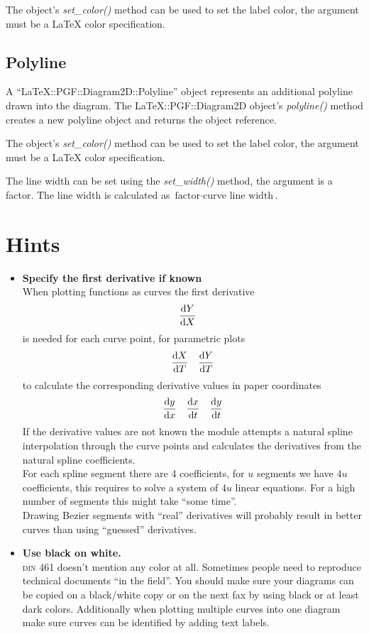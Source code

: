\documentclass[origlongtable]{scrartcl}
\begin{document}
The object's \textit{set\_color()\/} method can be used to set the label
color, the argument must be a \LaTeX{} color specification.
\clearpage
\subsection{Polyline}
A ``LaTeX::PGF::Diagram2D::Polyline'' object represents an additional
polyline drawn into the diagram.
The LaTeX::PGF::Diagram2D object's \textit{polyline()\/} method creates a new
polyline object and returns the object reference.

The object's \textit{set\_color()\/} method can be used to set the label
color, the argument must be a \LaTeX{} color specification.

The line width can be set using the \textit{set\_width()\/} method, the
argument is a factor. The line width is calculated as
\(\text{factor}\cdot{}\text{curve line width}\).
\clearpage
\section{Hints}
\begin{itemize}
\item	\textbf{Specify the first derivative if known}\\
When plotting functions as curves the first derivative
\begin{align*}\frac{\mathrm{d} Y}{\mathrm{d} X}&\end{align*} is needed for each curve
point, for parametric plots
\begin{align*}\frac{\mathrm{d} X}{\mathrm{d} T}&&\frac{\mathrm{d} Y}{\mathrm{d} T}\end{align*}
to calculate the corresponding derivative values in paper coordinates
\begin{align*}\frac{\mathrm{d} y}{\mathrm{d} x}&&\frac{\mathrm{d} x}{\mathrm{d} t}&&\frac{\mathrm{d} y}{\mathrm{d} t}\end{align*}
If the derivative values are not known the module attempts a natural spline
interpolation through the curve points and calculates the derivatives from
the natural spline coefficients.\\
For each spline segment there are 4 coefficients, for \(u\) segments we
have \(4u\) coefficients, this requires to solve a system of \(4u\)
linear equations. For a high number of segments this might take
``some time''.\\
Drawing Bezier segments with ``real'' derivatives will probably result
in better curves than using ``guessed'' derivatives.
\item	\textbf{Use black on white.}\\
\textsc{din} 461 doesn't mention any color at all. Sometimes people need to
reproduce technical documents ``in the field''. You should make sure your
diagrams can be copied  on a black/white copy or on the next fax by
using black or at least dark colors. Additionally when plotting
multiple curves into one diagram make sure curves can be identified
by adding text labels.
\end{itemize}
\clearpage
\end{document}
